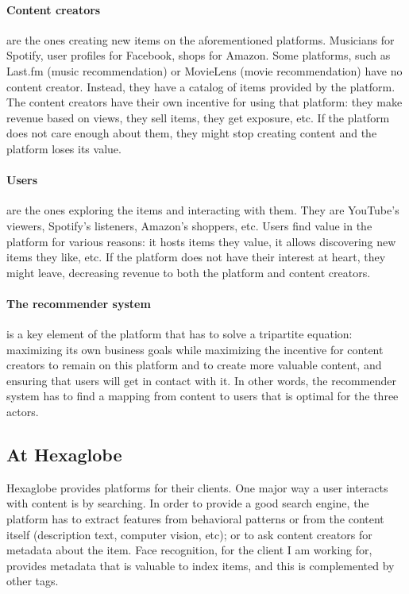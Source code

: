 \paragraph{Content creators} are the ones creating new items on the aforementioned platforms. Musicians for Spotify, user profiles for Facebook, shops for Amazon. Some platforms, such as Last.fm  (music recommendation) or MovieLens (movie recommendation) have no content creator. Instead, they have a catalog of items provided by the platform. The content creators have their own incentive for using that platform: they make revenue based on views, they sell items, they get exposure, etc. If the platform does not care enough about them, they might stop creating content and the platform loses its value.

\paragraph{Users} are the ones exploring the items and interacting with them. They are YouTube's viewers, Spotify's listeners, Amazon's shoppers, etc. Users find value in the platform for various reasons: it hosts items they value, it allows discovering new items they like, etc. If the platform does not have their interest at heart, they might leave, decreasing revenue to both the platform and content creators.

\paragraph{The recommender system} is a key element of the platform that has to solve a tripartite equation: maximizing its own business goals while maximizing the incentive for content creators to remain on this platform and to create more valuable content, and ensuring that users will get in contact with it. In other words, the recommender system has to find a mapping from content to users that is optimal for the three actors.

\subsection{At Hexaglobe}

Hexaglobe provides platforms for their clients. One major way a user interacts with content is by searching. In order to provide a good search engine, the platform has to extract features from behavioral patterns or from the content itself (description text, computer vision, etc); or to ask content creators for metadata about the item. Face recognition, for the client I am working for, provides metadata that is valuable to index items, and this is complemented by other tags.

